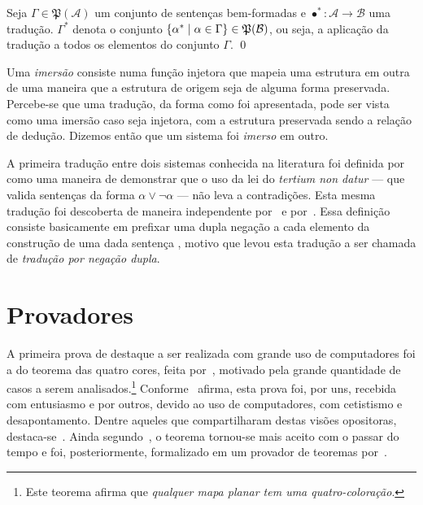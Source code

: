 \begin{tcolorbox}[enhanced jigsaw, breakable, sharp corners, colframe=black, colback=white, boxrule=0.5pt, left=1.5mm, right=1.5mm, top=1.5mm, bottom=1.5mm]
\begin{notation}
    Seja $\Gamma\in\mathfrak{P}(\mathcal{A})$ um conjunto de sentenças bem-formadas e $\bullet^*\mathrel{:}\mathcal{A}\to\mathcal{B}$ uma tradução. $\Gamma^*$ denota o conjunto $\left\{\alpha^*\mid\alpha\in\Gamma\right\}\in\mathfrak{P}(\mathcal{B})$, ou seja, a aplicação da tradução a todos os elementos do conjunto $\Gamma$.
    \qed{}
\end{notation}
\end{tcolorbox}

\vspace{.5\baselineskip}
Uma \emph{imersão} consiste numa função injetora que mapeia uma estrutura em outra de uma maneira que a estrutura de origem seja de alguma forma preservada.
Percebe-se que uma tradução, da forma como foi apresentada, pode ser vista como uma imersão caso seja injetora, com a estrutura preservada sendo a relação de dedução.
Dizemos então que um sistema foi \emph{imerso} em outro.

\vspace{.5\baselineskip}
A primeira tradução entre dois sistemas conhecida na literatura foi definida por~\cite{Kolmogorov.1967} como uma maneira de demonstrar que o uso da lei do \emph{tertium non datur} --- que valida sentenças da forma $\alpha\vee\neg\alpha$ --- não leva a contradições.
Esta mesma tradução foi descoberta de maneira independente por~\cite{Gödel.1986a} e por~\cite{Gentzen.1969}.
Essa definição consiste basicamente em prefixar uma dupla negação a cada elemento da construção de uma dada sentença \citep{Coniglio.2005}, motivo que levou esta tradução a ser chamada de \emph{tradução por negação dupla}.

\section{Provadores}\label{foundation.provers}

A primeira prova de destaque a ser realizada com grande uso de computadores foi a do teorema das quatro cores, feita por~\cite{Appel+Haken.1976}, motivado pela grande quantidade de casos a serem analisados.\footnote{Este teorema afirma que \emph{qualquer mapa planar tem uma quatro-coloração}.}
Conforme~\cite{Wilson.2021} afirma, esta prova foi, por uns, recebida com entusiasmo e por outros, devido ao uso de computadores, com cetistismo e desapontamento. Dentre aqueles que compartilharam destas visões opositoras, destaca-se~\cite{Tymoczko.1979}. Ainda segundo~\cite{Wilson.2021}, o teorema tornou-se mais aceito com o passar do tempo e foi, posteriormente, formalizado em um provador de teoremas por~\cite{Gonthier.2008}.

